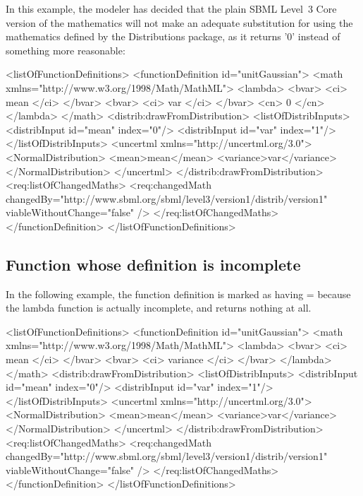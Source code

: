 In this example, the modeler has decided that the plain SBML Level~3 Core version of the mathematics will not make an adequate substitution for using the mathematics defined by the Distributions package, as it returns '0' instead of something more reasonable:

\begin{example}
<listOfFunctionDefinitions> 
  <functionDefinition id="unitGaussian"> 
    <math xmlns="http://www.w3.org/1998/Math/MathML"> 
      <lambda>
        <bvar>
          <ci> mean </ci>
        </bvar>
        <bvar>
          <ci> var </ci>
        </bvar>
        <cn> 0 </cn>
      </lambda>
    </math> 
    <distrib:drawFromDistribution>
      <listOfDistribInputs>
        <distribInput id="mean" index="0"/>
        <distribInput id="var" index="1"/>
      </listOfDistribInputs>
      <uncertml xmlns="http://uncertml.org/3.0">
         <NormalDistribution>
           <mean>mean</mean>
           <variance>var</variance>
         </NormalDistribution>
      </uncertml>
    </distrib:drawFromDistribution>
    <req:listOfChangedMaths>
      <req:changedMath changedBy="http://www.sbml.org/sbml/level3/version1/distrib/version1"
                       viableWithoutChange="false" />
    </req:listOfChangedMaths>
  </functionDefinition> 
</listOfFunctionDefinitions> 
\end{example} 


\subsection{Function whose definition is incomplete}

In the following example, the function definition is marked as having = because the lambda function is actually incomplete, and returns nothing at all.

\begin{example}
<listOfFunctionDefinitions> 
  <functionDefinition id="unitGaussian"> 
    <math xmlns="http://www.w3.org/1998/Math/MathML"> 
      <lambda>
        <bvar>
          <ci> mean </ci>
        </bvar>
        <bvar>
          <ci> variance </ci>
        </bvar>
      </lambda>
    </math> 
    <distrib:drawFromDistribution>
      <listOfDistribInputs>
        <distribInput id="mean" index="0"/>
        <distribInput id="var" index="1"/>
      </listOfDistribInputs>
      <uncertml xmlns="http://uncertml.org/3.0">
         <NormalDistribution>
           <mean>mean</mean>
           <variance>var</variance>
         </NormalDistribution>
      </uncertml>
    </distrib:drawFromDistribution>
    <req:listOfChangedMaths>
      <req:changedMath changedBy="http://www.sbml.org/sbml/level3/version1/distrib/version1"
                       viableWithoutChange="false" />
    </req:listOfChangedMaths>
  </functionDefinition> 
</listOfFunctionDefinitions> 
\end{example}
